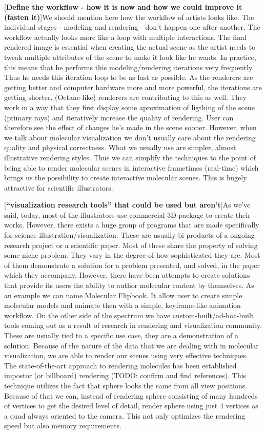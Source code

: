 \documentclass[
  digital, %
  table,   %
  nolof,     %
  nolot,     %
]{fithesis3}
\begin{document}
[\textbf{Define the workflow - how it is now and how we could improve it (fasten it)}]We should mention here how the workflow of artists looks like. The individual stages - modeling and rendering - don't happen one after another. The workflow actually looks more like a loop with multiple interactions. The final rendered image is essential when creating the actual scene as the artist needs to tweak multiple attributes of the scene to make it look like he wants. In practice, this means that he performs this modeling/rendering iterations very frequently. Thus he needs this iteration loop to be as fast as possible. As the renderers are getting better and computer hardware more and more powerful, the iterations are getting shorter. (Octane-like) renderers are contributing to this as well. They work in a way that they first display some aproximation of ligthing of the scene (primary rays) and iteratively increase the quality of rendering. User can therefore see the effect of changes he's made in the scene sooner. However, when we talk about molecular visualization we don't usually care about the rendering quality and physical correctness. What we usually use are simpler, almost illustrative rendering styles. Thus we can simplify the techniques to the point of being able to render molecular scenes in interactive frametimes (real-time) which brings us the possibility to create interactive molecular scenes. This is hugely attractive for scientific illustrators.

[\textbf{``visualization research tools'' that could be used but aren't}]As we've said, today, most of the illustrators use commercial 3D package to create their works. However, there exists a huge group of programs that are made specifically for science illustration/visualization. These are usually bi-products of a ongoing research project or a scientific paper. Most of these share the property of solving some niche problem. They vary in the degree of how sophisticated they are. Most of them demonstrate a solution for a problem presented, and solved, in the paper which they accompany. However, there have been attempts to create solutions that provide its users the ability to author molecular content by themselves. As an example we can name Molecular Flipbook. It allow user to create simple molecular models and animate then with a simple, keyframe-like animation workflow.
On the other side of the spectrum we have custom-built/ad-hoc-built tools coming out as a result of research in rendering and visualization community. These are usually tied to a specific use case, they are a demonstration of a solution. Because of the nature of the data that we are dealing with in molecular visualization, we are able to render our scenes using very effective techniques. The state-of-the-art approach to rendering molecules has been established impostor (or billboard) rendering (TODO: confirm and find references). This technique utilizes the fact that sphere looks the same from all view positions. Because of that we can, instead of rendering sphere consisting of many hundreds of vertices to get the desired level of detail, render sphere using just 4 vertices as a quad always oriented to the camera. This not only optimizes the rendering speed but also memory requirements.
\end{document}
